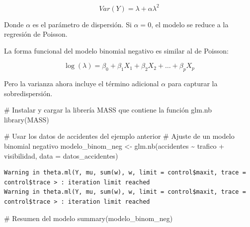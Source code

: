 \documentclass[
  letterpaper,
  DIV=11,
  numbers=noendperiod]{scrreprt}
\newenvironment{Shaded}{\begin{snugshade}}{\end{snugshade}}
\newcommand{\AttributeTok}[1]{\textcolor[rgb]{0.40,0.45,0.13}{#1}}
\newcommand{\CommentTok}[1]{\textcolor[rgb]{0.37,0.37,0.37}{#1}}
\newcommand{\FunctionTok}[1]{\textcolor[rgb]{0.28,0.35,0.67}{#1}}
\newcommand{\NormalTok}[1]{\textcolor[rgb]{0.00,0.23,0.31}{#1}}
\newcommand{\OtherTok}[1]{\textcolor[rgb]{0.00,0.23,0.31}{#1}}
\newcommand{\SpecialCharTok}[1]{\textcolor[rgb]{0.37,0.37,0.37}{#1}}
\begin{document}
\[
Var(Y) = \lambda + \alpha \lambda^2
\]

Donde \(\alpha\) es el parámetro de dispersión. Si \(\alpha = 0\), el
modelo se reduce a la regresión de Poisson.

La forma funcional del modelo binomial negativo es similar al de
Poisson:

\[
\log(\lambda) = \beta_0 + \beta_1 X_1 + \beta_2 X_2 + \dots + \beta_p X_p
\]

Pero la varianza ahora incluye el término adicional \(\alpha\) para
capturar la sobredispersión.

\begin{tcolorbox}[enhanced jigsaw, breakable, toprule=.15mm, bottomtitle=1mm, coltitle=black, colbacktitle=quarto-callout-tip-color!10!white, titlerule=0mm, opacitybacktitle=0.6, bottomrule=.15mm, toptitle=1mm, title=\textcolor{quarto-callout-tip-color}{\faLightbulb}\hspace{0.5em}{Ejemplo}, arc=.35mm, rightrule=.15mm, opacityback=0, colframe=quarto-callout-tip-color-frame, leftrule=.75mm, left=2mm, colback=white]

\begin{Shaded}
\begin{Highlighting}[]
\CommentTok{\# Instalar y cargar la librería MASS que contiene la función glm.nb}
\FunctionTok{library}\NormalTok{(MASS)}

\CommentTok{\# Usar los datos de accidentes del ejemplo anterior}
\CommentTok{\# Ajuste de un modelo binomial negativo}
\NormalTok{modelo\_binom\_neg }\OtherTok{\textless{}{-}} \FunctionTok{glm.nb}\NormalTok{(accidentes }\SpecialCharTok{\textasciitilde{}}\NormalTok{ trafico }\SpecialCharTok{+}\NormalTok{ visibilidad, }\AttributeTok{data =}\NormalTok{ datos\_accidentes)}
\end{Highlighting}
\end{Shaded}

\begin{verbatim}
Warning in theta.ml(Y, mu, sum(w), w, limit = control$maxit, trace =
control$trace > : iteration limit reached
Warning in theta.ml(Y, mu, sum(w), w, limit = control$maxit, trace =
control$trace > : iteration limit reached
\end{verbatim}

\begin{Shaded}
\begin{Highlighting}[]
\CommentTok{\# Resumen del modelo}
\FunctionTok{summary}\NormalTok{(modelo\_binom\_neg)}
\end{Highlighting}
\end{Shaded}


\end{tcolorbox}
\end{document}
